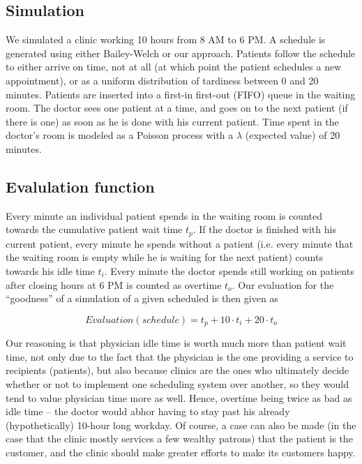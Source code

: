 \documentclass{article} %
\begin{document}
\subsection{Simulation}

We simulated a clinic working 10 hours from 8 AM to 6 PM. A schedule is generated using either Bailey-Welch or our approach. Patients follow the schedule to either arrive on time, not at all (at which point the patient schedules a new appointment), or as a uniform distribution of tardiness between 0 and 20 minutes. Patients are inserted into a first-in first-out (FIFO) queue in the waiting room. The doctor sees one patient at a time, and goes on to the next patient (if there is one) as soon as he is done with his current patient. Time spent in the doctor's room is modeled as a Poisson process with a $\lambda$ (expected value) of 20 minutes.

\subsection{Evalulation function}

Every minute an individual patient spends in the waiting room is counted towards the cumulative patient wait time $t_p$. If the doctor is finished with his current patient, every minute he spends without a patient (i.e. every minute that the waiting room is empty while he is waiting for the next patient) counts towards his idle time $t_i$. Every minute the doctor spends still working on patients after closing hours at 6 PM is counted as overtime $t_o$. Our evaluation for the ``goodness'' of a simulation of a given scheduled is then given as

\begin{equation}
Evaluation(schedule) = t_p + 10 \cdot t_i + 20 \cdot t_o
\end{equation}

Our reasoning is that physician idle time is worth much more than patient wait time, not only due to the fact that the physician is the one providing a service to recipients (patients), but also because clinics are the ones who ultimately decide whether or not to implement one scheduling system over another, so they would tend to value physician time more as well. Hence, overtime being twice as bad as idle time -- the doctor would abhor having to stay past his already (hypothetically) 10-hour long workday. Of course, a case can also be made (in the case that the clinic mostly services a few wealthy patrons) that the patient is the customer, and the clinic should make greater efforts to make its customers happy.
\end{document}
